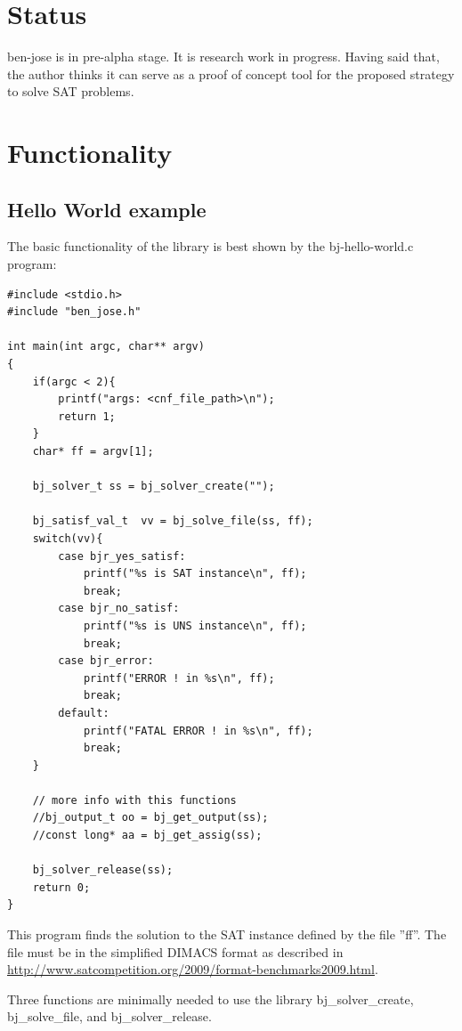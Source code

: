 \documentclass{easychair}
\newcommand{\bjsolvercreate}{bj\_solver\_create}
\newcommand{\bjsolvefile}{bj\_solve\_file}
\newcommand{\bjsolverrelease}{bj\_solver\_release}
\begin{document}
\section{Status}

ben-jose is in pre-alpha stage. It is research work in progress. Having said that, the author thinks it can serve as a proof of concept tool for the proposed strategy to solve SAT problems.

\section{Functionality}
\label{sect:funtionality}

\subsection{Hello World example}
\label{sect:dimacs}

The basic functionality of the library is best shown by the bj-hello-world.c program:

\begin{lstlisting}[label=hello-prog, caption=bj-hello-world.c program,]
#include <stdio.h>
#include "ben_jose.h"

int main(int argc, char** argv)
{
	if(argc < 2){
		printf("args: <cnf_file_path>\n");
		return 1;
	}
	char* ff = argv[1];
	
	bj_solver_t ss = bj_solver_create("");
	
	bj_satisf_val_t  vv = bj_solve_file(ss, ff);
	switch(vv){
		case bjr_yes_satisf:
			printf("%s is SAT instance\n", ff);
			break;
		case bjr_no_satisf:
			printf("%s is UNS instance\n", ff);
			break;
		case bjr_error:
			printf("ERROR ! in %s\n", ff);
			break;
		default:
			printf("FATAL ERROR ! in %s\n", ff);
			break;
	}
	
	// more info with this functions
	//bj_output_t oo = bj_get_output(ss);
	//const long* aa = bj_get_assig(ss);
	
	bj_solver_release(ss);
	return 0;
}
\end{lstlisting}

This program finds the solution to the SAT instance defined by the file ''ff''. The file must be in the simplified DIMACS format as described in \url{http://www.satcompetition.org/2009/format-benchmarks2009.html}.

Three functions are minimally needed to use the library \bjsolvercreate, \bjsolvefile, and \bjsolverrelease.
\end{document}
